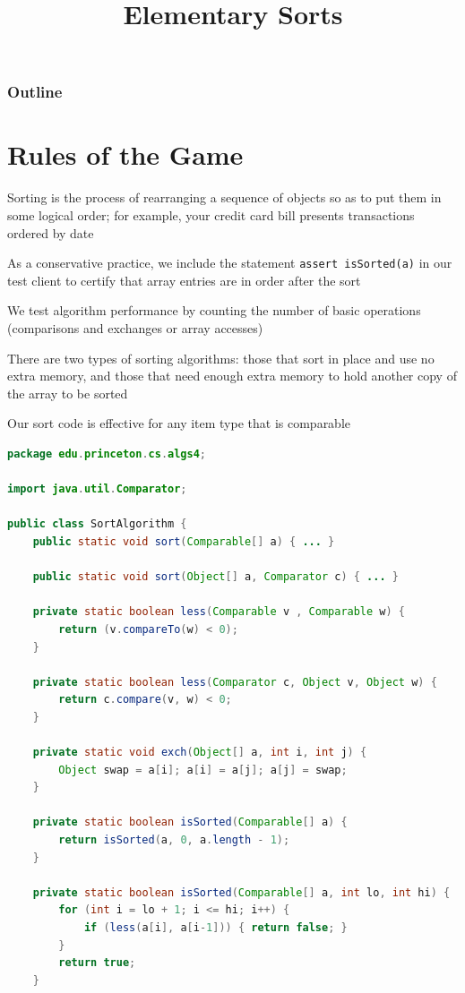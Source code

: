 \documentclass[8pt,a4paper,compress]{beamer}
\title{Elementary Sorts}
\date{}
\begin{document}
\begin{frame}
\vfill
\titlepage
\end{frame}

\begin{frame}
\frametitle{Outline}
\tableofcontents
\end{frame}

\section{Rules of the Game}
\begin{frame}[fragile]
Sorting is the process of rearranging a sequence of objects so as to put them in some logical order; for example, your credit card bill presents transactions ordered by date

\bigskip

As a conservative practice, we include the statement \lstinline{assert isSorted(a)} in our test client to certify that array entries are in order after the sort

\bigskip

We test algorithm performance by counting the number of basic
operations (comparisons and exchanges or array accesses)

\bigskip

There are two types of sorting algorithms: those that sort in place and use no extra memory, and those that need enough extra memory to hold another copy of the array to be sorted

\bigskip

Our sort code is effective for any item type that is comparable
\end{frame}

\begin{frame}[fragile]
\begin{lstlisting}[language=Java]
package edu.princeton.cs.algs4;

import java.util.Comparator;

public class SortAlgorithm {
    public static void sort(Comparable[] a) { ... }
    
    public static void sort(Object[] a, Comparator c) { ... }

    private static boolean less(Comparable v , Comparable w) {
        return (v.compareTo(w) < 0);
    }

    private static boolean less(Comparator c, Object v, Object w) {
        return c.compare(v, w) < 0;
    }
        
    private static void exch(Object[] a, int i, int j) {
        Object swap = a[i]; a[i] = a[j]; a[j] = swap;
    }
    
    private static boolean isSorted(Comparable[] a) {
        return isSorted(a, 0, a.length - 1);
    }

    private static boolean isSorted(Comparable[] a, int lo, int hi) {
        for (int i = lo + 1; i <= hi; i++) {
            if (less(a[i], a[i-1])) { return false; }
        }
        return true;
    }
\end{lstlisting}
\end{frame}
\end{document}
